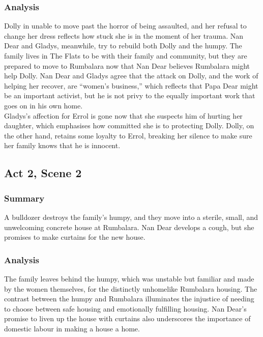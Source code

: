 \documentclass[a4paper]{article}
\begin{document}
\subsubsection{Analysis}
Dolly in unable to move past the horror of being assaulted, and her
refusal to change her dress reflects how stuck she is in the moment
of her trauma. Nan Dear and Gladys, meanwhile, try to rebuild both
Dolly and the humpy. The family lives in The Flats to be with their
family and community, but they are prepared to move to Rumbalara
now that Nan Dear believes Rumbalara might help Dolly. Nan Dear
and Gladys agree that the attack on Dolly, and the work of helping
her recover, are “women’s business,” which reflects that Papa Dear
might be an important activist, but he is not privy to the equally
important work that goes on in his own home.\\

Gladys’s affection for Errol is gone now that she suspects him of
hurting her daughter, which emphasises how committed she is to
protecting Dolly. Dolly, on the other hand, retains some loyalty to
Errol, breaking her silence to make sure her family knows that he is
innocent.\\

\subsection{Act 2, Scene 2}
\subsubsection{Summary}
A bulldozer destroys the family’s humpy, and they move into a
sterile, small, and unwelcoming concrete house at Rumbalara.
Nan Dear develops a cough, but she promises to make curtains
for the new house.\\

\subsubsection{Analysis}
The family leaves behind the humpy, which was unstable but
familiar and made by the women themselves, for the distinctly unhomelike
Rumbalara housing. The contrast between the humpy and
Rumbalara illuminates the injustice of needing to choose between
safe housing and emotionally fulfilling housing. Nan Dear’s promise
to liven up the house with curtains also underscores the importance
of domestic labour in making a house a home.\\
\end{document}
